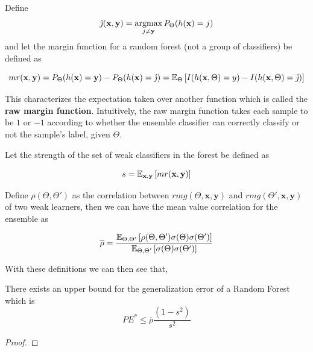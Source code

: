 \begin{appendices}
Define $$\hat{\jmath}( \textbf{x},\textbf{y}) = \operatorname*{argmax}_{j \neq \textbf{y}} P_{\Theta}(h(\textbf{x}) = j)$$ and let the margin function for a random forest (not a group of classifiers) be defined as

\[\label{eq:rf-marginFunRf}
mr(\textbf{x},\textbf{y}) = P_{\Theta}(h(\textbf{x}) = \textbf{y}) - P_{\Theta}(h(\textbf{x}) = \hat{\jmath})
\\
= \operatorname{\mathbb{E}}_{\Theta} \left[ I(h(\textbf{x},\Theta ) = y ) - I( h( \textbf{x},\Theta ) = \hat{\jmath} ) \right]
\]

This characterizes the expectation taken over another function which is called the \textbf{raw margin function}\label{eq:rf-rawMarginFun}.
Intuitively, the raw margin function takes each sample to be $1$ or $-1$ according to whether the ensemble classifier can correctly classify or not the sample's label, given $\Theta$.

Let the strength of the set of weak classifiers in the forest be defined as

\begin{equation}\label{eq:rf-strength}
s = \operatorname{\mathbb{E}}_{\textbf{x},\textbf{y}} \left[ mr(\textbf{x},\textbf{y} ) \right]
\end{equation}

Define $ \rho(\Theta, \Theta')$ as the correlation between $rmg(\Theta,\textbf{x},\textbf{y})$ and $rmg(\Theta',\textbf{x},\textbf{y})$ of two weak learners, then we can have the mean value correlation for the ensemble as 

\begin{equation}\label{eq:rf-meanCorrelation}
\overline{\rho} = \frac{\operatorname{\mathbb{E}}_{\Theta, \Theta'} \left[ \rho(\Theta, \Theta') \sigma(\Theta) \sigma(\Theta')\right]}
{\operatorname{\mathbb{E}}_{\Theta, \Theta'} \left[ \sigma(\Theta) \sigma(\Theta')\right]}
\end{equation}

With these definitions we can then see that,

\begin{theorem}
	There exists an upper bound for the generalization error of a Random Forest which is    \begin{equation}\label{eq:rf-PEBound}
	PE^* \leq \overline{\rho}\frac{(1-s^2)}{s^2}
	\end{equation}
\end{theorem}


\begin{proof}
	

\end{proof}
\end{appendices}
